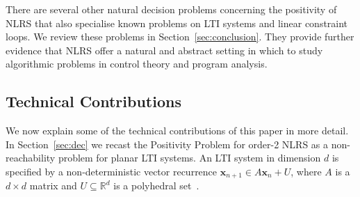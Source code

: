 \documentclass[a4paper,UKenglish,cleveref, autoref, thm-restate]{lipics-v2021}
\begin{document}
There are several other natural decision problems concerning the positivity of
NLRS that also specialise known problems on LTI
systems and linear constraint loops.  We review these problems in Section~\ref{sec:conclusion}.
They provide further evidence that NLRS offer a natural and abstract setting in which to 
study algorithmic problems in control theory and program analysis.

\subsection{Technical Contributions}
We now explain some of the technical contributions of this paper in more detail.
In Section~\ref{sec:dec} we recast the Positivity Problem for order-2 NLRS as a non-reachability problem for planar LTI systems.
An LTI system in
dimension $d$ is specified by a non-deterministic vector recurrence
$\boldsymbol x_{n+1} \in A\boldsymbol x_n + U$, where $A$ is a
$d\times d$ matrix and $U\subseteq \mathbb R^d$ is a polyhedral set~\cite{FijalkowOPP019}.
\end{document}
